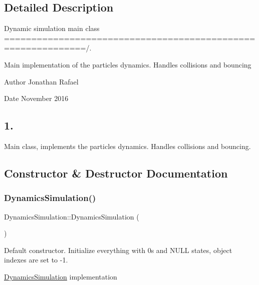 \subsection{Detailed Description}
Dynamic simulation main class =============================================================/. 

Main implementation of the particles dynamics. Handles collisions and bouncing \begin{DoxyAuthor}{Author}
Jonathan Rafael 
\end{DoxyAuthor}
\begin{DoxyDate}{Date}
November 2016 \subsection*{1. }
\end{DoxyDate}


Main class, implements the particles dynamics. Handles collisions and bouncing. 

\subsection{Constructor \& Destructor Documentation}
\mbox{\label{class_dynamics_simulation_ad9a3e1f235466c3827cb49c67d3a6147}} 
\subsubsection{\texorpdfstring{Dynamics\+Simulation()}{DynamicsSimulation()}\hspace{0.1cm}{\footnotesize\ttfamily [1/3]}}
{\footnotesize\ttfamily Dynamics\+Simulation\+::\+Dynamics\+Simulation (\begin{DoxyParamCaption}{ }\end{DoxyParamCaption})}



Default constructor. Initialize everything with 0\textquotesingle{}s and N\+U\+LL states, object indexes are set to -\/1. 

\hyperlink{class_dynamics_simulation}{Dynamics\+Simulation} implementation \mbox{\label{class_dynamics_simulation_aa603b5ba682b1b37cc96dd8be113cb52}} 
